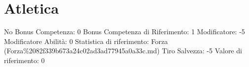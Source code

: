 \section{Atletica}\label{atletica}

\begin{description}
\tightlist
\item[Tags: ABI]
No Bonus Competenza: 0 Bonus Competenza di Riferimento: 1 Modificatore:
-5 Modificatore Abilità: 0 Statistica di riferimento: Forza
(Forza\%2082f339b673a24c02ad3ad77945a0a33c.md) Tiro Salvezza: -5 Valore
di riferimento: 0
\end{description}
